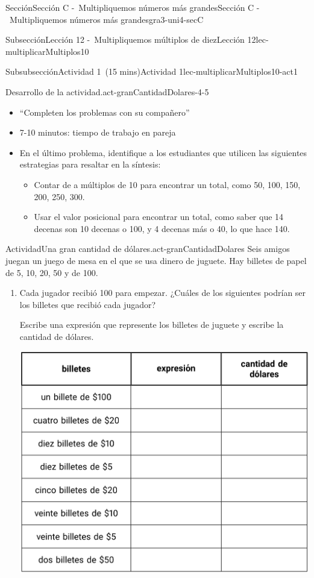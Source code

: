 \documentclass[oneside,10pt,]{article}
\begin{document}
\begin{sectionptx}{Sección}{Sección C -~Multipliquemos números más grandes}{}{Sección C -~Multipliquemos números más grandes}{}{}{gra3-uni4-secC}
\begin{subsectionptx}{Subsección}{Lección 12 -~Multipliquemos múltiplos de diez}{}{Lección 12}{}{}{lec-multiplicarMultiplos10}
\begin{subsubsectionptx}{Subsubsección}{Actividad 1~(15 mins)}{}{Actividad 1}{}{}{lec-multiplicarMultiplos10-act1}
\begin{paragraphs}{Desarrollo de la actividad.}{act-granCantidadDolares-4-5}
%
\begin{itemize}[label=\textbullet]
\item{}``Completen los problemas con su compañero''%
\item{}7-10 minutos: tiempo de trabajo en pareja%
\item{}En el último problema, identifique a los estudiantes que utilicen las siguientes estrategias para resaltar en la síntesis:%
%
\begin{itemize}[label=$\circ$]
\item{}Contar de a múltiplos de 10 para encontrar un total, como 50, 100, 150, 200, 250, 300.%
\item{}Usar el valor posicional para encontrar un total, como saber que 14 decenas son 10 decenas o 100, y 4 decenas más o 40, lo que hace 140.%
\end{itemize}
\end{itemize}
\end{paragraphs}%
\begin{activity}{Actividad}{Una gran cantidad de dólares.}{act-granCantidadDolares}%
Seis amigos juegan un juego de mesa en el que se usa dinero de juguete. Hay billetes de papel de \textdollar{}5, \textdollar{}10, \textdollar{}20, \textdollar{}50 y de \textdollar{}100.%
%
\begin{enumerate}
\item{}Cada jugador recibió \textdollar{}100 para empezar. ¿Cuáles de los siguientes podrían ser los billetes que recibió cada jugador?%
\par
Escribe una expresión que represente los billetes de juguete y escribe la cantidad de dólares.%
\begin{image}{0}{1}{0}{}%
\includegraphics[width=\linewidth]{external/tikz-source/unaGranCantidadDeDolares-tab1.pdf}

\end{image}
\end{enumerate}
\end{activity}
\end{subsubsectionptx}
\end{subsectionptx}
\end{sectionptx}
\end{document}
